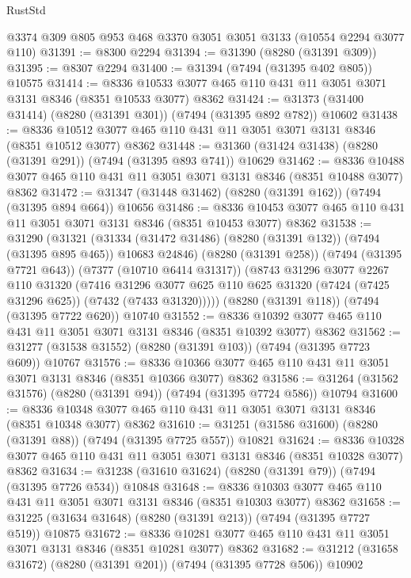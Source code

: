 \begin{lexlean}{RustStd}
\begin{coremodule}
    @3374
    @309
    @805
    @953
    @468
    @3370
    @3051
    @3051
    @3133
    (@10554 @2294 @3077 @110)
@31391 := @8300 @2294
@31394 := @31390 (@8280 (@31391 @309))
@31395 := @8307 @2294
@31400 := @31394 (@7494 (@31395 @402 @805)) @10575
@31414 := @8336 @10533 @3077 @465 @110 @431 @11 @3051 @3071 @3131 @8346 (@8351 @10533 @3077) @8362
@31424 := @31373 (@31400 @31414) (@8280 (@31391 @301)) (@7494 (@31395 @892 @782)) @10602
@31438 := @8336 @10512 @3077 @465 @110 @431 @11 @3051 @3071 @3131 @8346 (@8351 @10512 @3077) @8362
@31448 := @31360 (@31424 @31438) (@8280 (@31391 @291)) (@7494 (@31395 @893 @741)) @10629
@31462 := @8336 @10488 @3077 @465 @110 @431 @11 @3051 @3071 @3131 @8346 (@8351 @10488 @3077) @8362
@31472 := @31347 (@31448 @31462) (@8280 (@31391 @162)) (@7494 (@31395 @894 @664)) @10656
@31486 := @8336 @10453 @3077 @465 @110 @431 @11 @3051 @3071 @3131 @8346 (@8351 @10453 @3077) @8362
@31538 := @31290
    (@31321
      (@31334 (@31472 @31486) (@8280 (@31391 @132)) (@7494 (@31395 @895 @465)) @10683 @24846)
      (@8280 (@31391 @258))
      (@7494 (@31395 @7721 @643))
      (@7377 (@10710 @6414 @31317))
      (@8743
        @31296
        @3077
        @2267
        @110
        @31320
        (@7416
          @31296
          @3077
          @625
          @110
          @625
          @31320
          (@7424 (@7425 @31296 @625))
          (@7432 (@7433 @31320)))))
    (@8280 (@31391 @118))
    (@7494 (@31395 @7722 @620))
    @10740
@31552 := @8336 @10392 @3077 @465 @110 @431 @11 @3051 @3071 @3131 @8346 (@8351 @10392 @3077) @8362
@31562 := @31277 (@31538 @31552) (@8280 (@31391 @103)) (@7494 (@31395 @7723 @609)) @10767
@31576 := @8336 @10366 @3077 @465 @110 @431 @11 @3051 @3071 @3131 @8346 (@8351 @10366 @3077) @8362
@31586 := @31264 (@31562 @31576) (@8280 (@31391 @94)) (@7494 (@31395 @7724 @586)) @10794
@31600 := @8336 @10348 @3077 @465 @110 @431 @11 @3051 @3071 @3131 @8346 (@8351 @10348 @3077) @8362
@31610 := @31251 (@31586 @31600) (@8280 (@31391 @88)) (@7494 (@31395 @7725 @557)) @10821
@31624 := @8336 @10328 @3077 @465 @110 @431 @11 @3051 @3071 @3131 @8346 (@8351 @10328 @3077) @8362
@31634 := @31238 (@31610 @31624) (@8280 (@31391 @79)) (@7494 (@31395 @7726 @534)) @10848
@31648 := @8336 @10303 @3077 @465 @110 @431 @11 @3051 @3071 @3131 @8346 (@8351 @10303 @3077) @8362
@31658 := @31225 (@31634 @31648) (@8280 (@31391 @213)) (@7494 (@31395 @7727 @519)) @10875
@31672 := @8336 @10281 @3077 @465 @110 @431 @11 @3051 @3071 @3131 @8346 (@8351 @10281 @3077) @8362
@31682 := @31212 (@31658 @31672) (@8280 (@31391 @201)) (@7494 (@31395 @7728 @506)) @10902

\end{coremodule}
\end{lexlean}
